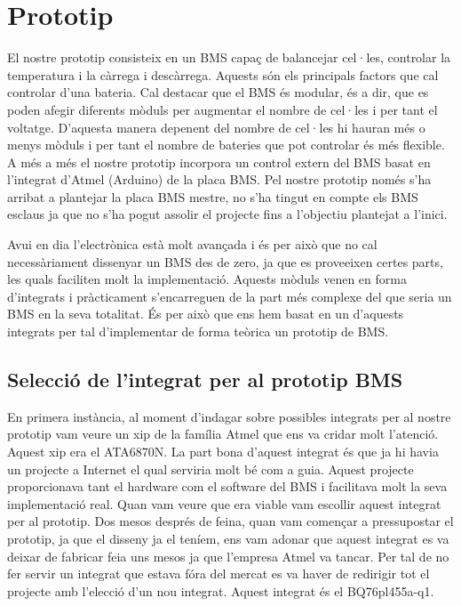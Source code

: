 \chapter{Prototip}
\label{chap:Prototip}

El nostre prototip consisteix en un BMS capaç de balancejar cel·les, controlar la temperatura i la càrrega i descàrrega. Aquests són els principals factors que cal controlar d'una bateria. Cal destacar que el BMS és modular, és a dir, que es poden afegir diferents mòduls per augmentar el nombre de cel·les i per tant el voltatge. D'aquesta manera depenent del nombre de cel·les hi hauran més o menys mòduls i per tant el nombre de bateries que pot controlar és més flexible. A més a més el nostre prototip incorpora un control extern del BMS basat en l'integrat d'Atmel (Arduino) de la placa BMS. Pel nostre prototip només s'ha arribat a plantejar la placa BMS mestre, no s'ha tingut en compte els BMS esclaus ja que no s'ha pogut assolir el projecte fins a l'objectiu plantejat a l'inici.

Avui en dia l'electrònica està molt avançada i és per això que no cal \newline necessàriament dissenyar un BMS des de zero, ja que es proveeixen certes parts, les quals faciliten molt la implementació. Aquests mòduls venen en forma d'integrats i pràcticament s'encarreguen de la part més complexe del que seria un BMS en la seva totalitat. És per això que ens hem basat en un d'aquests integrats per tal d'implementar de forma teòrica un prototip de BMS. 

\section{Selecció de l'integrat per al prototip BMS}
En primera instància, al moment d'indagar sobre possibles integrats per al nostre prototip vam veure un xip de la família Atmel que ens va cridar molt l'atenció. Aquest xip era el ATA6870N. La part bona d'aquest integrat és que ja hi havia un projecte a Internet el qual serviria molt bé com a guia. Aquest projecte proporcionava tant el hardware com el software del BMS i facilitava molt la seva implementació real. Quan vam veure que era viable vam escollir aquest integrat per al prototip. Dos mesos després de feina, quan vam començar a pressupostar el prototip, ja que el disseny ja el teníem, ens vam adonar que aquest integrat es va deixar de fabricar feia uns mesos ja que l'empresa Atmel va tancar. Per tal de no fer servir un integrat que estava fóra del mercat es va haver de redirigir tot el projecte amb l'elecció d'un nou integrat. Aquest integrat és el BQ76pl455a-q1. 


